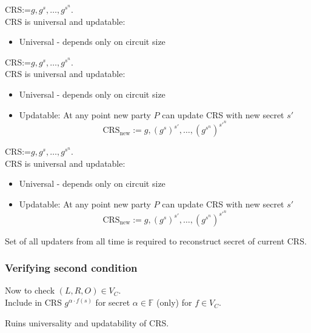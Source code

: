 \documentclass[shadesubsections,trans,14pt,mathserif]{beamer}
\newcommand{\F}{\ensuremath{\mathbb F}}
\newcommand{\defeq}{\ensuremath{:=}}
\newcommand{\spac}{\\  \vspace{0.2in} \noindent}
\begin{document}
 \begin{frame}

 \noindent
 CRS:=$g,g^s,\ldots,g^{s^n}$.\\
  \vspace{0.2in}
\noindent 
 CRS is universal and updatable:
 \begin{itemize}
  \item Universal - depends only on circuit size
 \end{itemize}

\end{frame}

 \begin{frame}

 \noindent
 CRS:=$g,g^s,\ldots,g^{s^n}$.\\
  \vspace{0.2in}
\noindent 
 CRS is universal and updatable:
 \begin{itemize}
  \item Universal - depends only on circuit size
  \item Updatable:  At any point new party $P$ can update CRS with new secret $s'$
  \[\mathrm{CRS_{new}}\defeq g,(g^s)^{s'},\ldots,(g^{s^n})^{s'^n}\]
 \end{itemize}

\end{frame}
 \begin{frame}

 \noindent
 CRS:=$g,g^s,\ldots,g^{s^n}$.\\
  \vspace{0.2in}
\noindent 
 CRS is universal and updatable:
 \begin{itemize}
  \item Universal - depends only on circuit size
  \item Updatable:  At any point new party $P$ can update CRS with new secret $s'$
  \[\mathrm{CRS_{new}}\defeq g,(g^s)^{s'},\ldots,(g^{s^n})^{s'^n}\]
 \end{itemize}
Set of all updaters from all time is required to reconstruct secret of current CRS.

\end{frame}

 \begin{frame}
\frametitle{Verifying second condition}   %
 Now to check $(L,R,O) \in V_C$. \spac
 Include in CRS 
 $g^{\alpha\cdot f(s)}$
 for secret $\alpha\in \F$ (only) for $f\in V_C$. \spac
 
 Ruins universality and updatability of CRS.
 
 
 
\end{frame}
\end{document}
